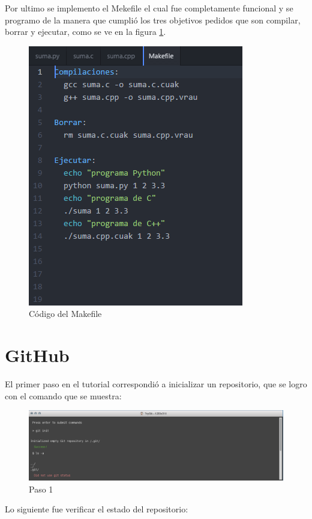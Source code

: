 \documentclass[11pt]{article}
\begin{document}
Por ultimo se implemento el Mekefile el cual fue completamente funcional y se programo de la manera que cumplió los tres objetivos pedidos que son compilar, borrar y ejecutar, como se ve en la figura \ref{fig:mk}.

\begin{figure}[H]
\centering
\includegraphics[scale=0.8]{img/mk.png}
\caption{Código del Makefile}
\label{fig:mk}
\end{figure}
\newpage

\section*{GitHub}

El primer paso en el tutorial correspondió a inicializar un repositorio, que se logro con el comando que se muestra:

\begin{figure}[H]
\centering
\includegraphics[scale=0.8]{img/1.png}
\caption{Paso 1}
\label{fig:1}
\end{figure}

Lo siguiente fue verificar el estado del repositorio:
\end{document}
